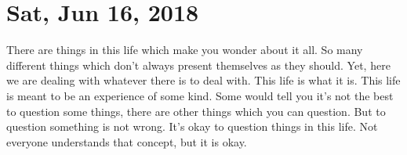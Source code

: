 \section{Sat, Jun 16, 2018}

There are things in this life which make you wonder about it all. So many
different things which don't always present themselves as they should. Yet, here
we are dealing with whatever there is to deal with. This life is what it is.
This life is meant to be an experience of some kind. Some would tell you it's
not the best to question some things, there are other things which you can
question. But to question something is not wrong. It's okay to question things
in this life. Not everyone understands that concept, but it is okay.
